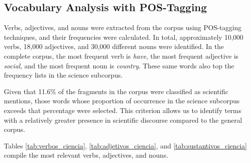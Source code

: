 \documentclass[pdflatex,sn-mathphys-num,iicol]{sn-jnl}
\begin{document}
	\subsection{Vocabulary Analysis with POS-Tagging}\label{subsec:pos_results}
	
	Verbs, adjectives, and nouns were extracted from the corpus using POS-tagging techniques, and their frequencies were calculated. In total, approximately 10,000 verbs, 18,000 adjectives, and 30,000 different nouns were identified. In the complete corpus, the most frequent verb is \textit{have}, the most frequent adjective is \textit{social}, and the most frequent noun is \textit{country}. These same words also top the frequency lists in the science subcorpus.
	
	Given that 11.6\% of the fragments in the corpus were classified as scientific mentions, those words whose proportion of occurrence in the science subcorpus exceeds that percentage were selected. This criterion allows us to identify terms with a relatively greater presence in scientific discourse compared to the general corpus.
	
	Tables \ref{tab:verbos_ciencia}, \ref{tab:adjetivos_ciencia}, and \ref{tab:sustantivos_ciencia} compile the most relevant verbs, adjectives, and nouns.
	
\end{document}
